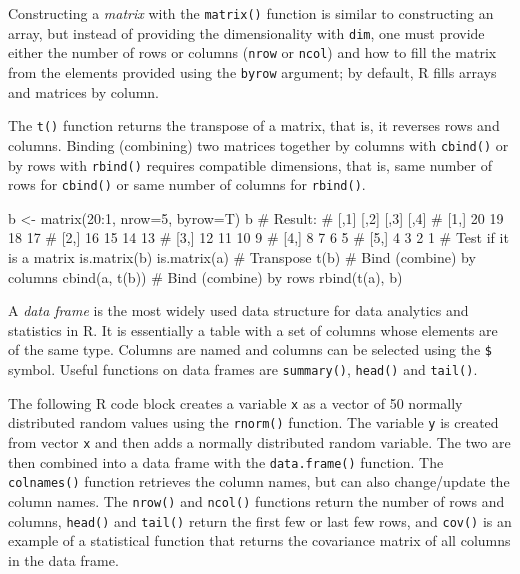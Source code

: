 Constructing a \emph{matrix} with the \texttt{matrix()} function is similar to constructing an array, but instead of providing the dimensionality with \texttt{dim}, one must provide either the number of rows or columns (\texttt{nrow} or \texttt{ncol}) and how to fill the matrix from the elements provided using the \texttt{byrow} argument; by default, R fills arrays and matrices by column. 

The \texttt{t()} function returns the transpose of a matrix, that is, it reverses rows and columns. Binding (combining) two matrices together by columns with \texttt{cbind()} or by rows with \texttt{rbind()} requires compatible dimensions, that is, same number of rows for \texttt{cbind()} or same number of columns for \texttt{rbind()}.

\begin{Rcode}
b <- matrix(20:1, nrow=5, byrow=T)
b
# Result:
#      [,1] [,2] [,3] [,4]
# [1,]   20   19   18   17
# [2,]   16   15   14   13
# [3,]   12   11   10    9
# [4,]    8    7    6    5
# [5,]    4    3    2    1
# Test if it is a matrix
is.matrix(b)
is.matrix(a)
# Transpose
t(b)
# Bind (combine) by columns
cbind(a, t(b))
# Bind (combine) by rows
rbind(t(a), b)
\end{Rcode}

A \emph{data frame} is the most widely used data structure for data analytics and statistics in R. It is essentially a table with a set of columns whose elements are of the same type. Columns are named and columns can be selected using the \texttt{\$} symbol. Useful functions on data frames are \texttt{summary()}, \texttt{head()} and \texttt{tail()}. 

The following R code block creates a variable \texttt{x} as a vector of 50 normally distributed random values using the \texttt{rnorm()} function. The variable \texttt{y} is created from vector \texttt{x} and then adds a normally distributed random variable. The two are then combined into a data frame with the \texttt{data.frame()} function. The \texttt{colnames()} function retrieves the column names, but can also change/update the column names. The \texttt{nrow()} and \texttt{ncol()} functions return the number of rows and columns, \texttt{head()} and \texttt{tail()} return the first few or last few rows, and \texttt{cov()} is an example of a statistical function that returns the covariance matrix of all columns in the data frame.


